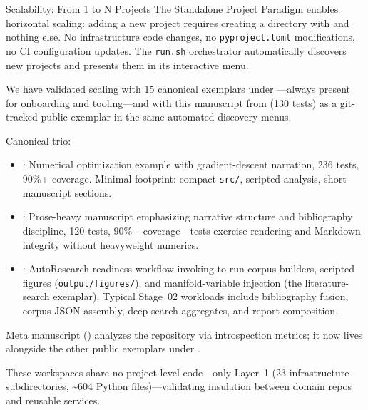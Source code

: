 \documentclass[
  ignorenonframetext,
]{beamer}
\author{\texorpdfstring{}{}}
\date{}
\providecommand{\tightlist}{%
  \setlength{\itemsep}{0pt}\setlength{\parskip}{0pt}}
\begin{document}
\begin{frame}{Scalability: From 1 to N
Projects}
\protect{}\label{scalability-from-1-to-n-projects}
The Standalone Project Paradigm enables horizontal scaling: adding a new
project requires creating a directory with
 and nothing else. No infrastructure code
changes, no \texttt{pyproject.toml} modifications, no CI configuration
updates. The \texttt{run.sh} orchestrator automatically discovers new
projects and presents them in its interactive menu.

We have validated scaling with 15 canonical exemplars under
---always present for onboarding and
tooling---and with this manuscript from
 (130 tests) as a
git-tracked public exemplar in the same automated discovery menus.

Canonical trio:

\begin{itemize}
\tightlist
\item
  \textbf{}: Numerical optimization
  example with gradient-descent narration, 236 tests, 90\%+ coverage.
  Minimal footprint: compact \texttt{src/}, scripted analysis, short
  manuscript sections.
\item
  \textbf{}: Prose-heavy manuscript
  emphasizing narrative structure and bibliography discipline, 120
  tests, 90\%+ coverage---tests exercise rendering and Markdown
  integrity without heavyweight numerics.
\item
  \textbf{}: AutoResearch
  readiness workflow invoking
   to run
  corpus builders, scripted figures (\texttt{output/figures/}), and
  manifold-variable injection (the literature-search exemplar). Typical
  Stage~02 workloads include bibliography fusion, corpus JSON assembly,
  deep-search aggregates, and report composition.
\end{itemize}

Meta manuscript
(\textbf{}) analyzes the
repository via  introspection metrics;
it now lives alongside the other public exemplars under
.

These workspaces share no project-level code---only Layer~1 (23
infrastructure subdirectories, \textasciitilde604 Python
files)---validating insulation between domain repos and reusable
services.


\end{frame}
\end{document}
